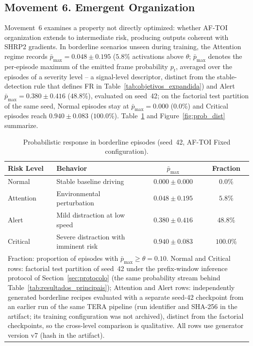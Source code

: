 \documentclass[a4paper,fleqn]{cas-dc}
\newcommand{\AFTOI}{\mbox{AF-TOI}\xspace}
\begin{document}
\subsection{Movement 6. Emergent Organization}
\label{sec:mov6_emergente}
Movement~6 examines a property not directly optimized: whether \AFTOI
organization extends to intermediate risk, producing outputs coherent with SHRP2
gradients. In borderline scenarios unseen during training, the Attention regime
records $\bar{p}_{\max} = 0.048 \pm 0.195$ ($5.8$\% activations above $\theta$;
{\color{\revcolor}$\bar{p}_{\max}$ denotes the per-episode maximum of the
emitted frame probability $p_t$, averaged over the episodes of a severity
level -- a signal-level descriptor, distinct from the stable-detection
rule that defines FR in Table~\ref{tab:objetivos_expandida}})
and Alert $\bar{p}_{\max} = 0.380 \pm 0.416$ ($48.8$\%), evaluated on seed~42{\color{\revcolor}; on the factorial test partition of the same seed, Normal episodes stay at $\bar{p}_{\max} = 0.000$ ($0.0$\%) and Critical episodes reach $0.940 \pm 0.083$ ($100.0$\%)}.
Table~\ref{tab:borderline} and Figure~\ref{fig:prob_dist} summarize.
\begin{table}[!tbp]
\centering
\caption{Probabilistic response in borderline episodes
(seed~42, \mbox{AF-TOI} Fixed configuration).}
\label{tab:borderline}
\footnotesize
\renewcommand{\arraystretch}{1.22}
\setlength{\tabcolsep}{3pt}
\begin{tabularx}{\columnwidth}{l X c c}
\toprule
\textbf{Risk Level} & \textbf{Behavior}
  & \textbf{$\bar{p}_{\max}$} & \textbf{Fraction} \\
\midrule
Normal    & Stable baseline driving
  & {\color{\revcolor}$0.000 \pm 0.000$} & $0.0$\% \\
\rowcolor{gray!8}
Attention & Environmental perturbation
  & $0.048 \pm 0.195$ & $5.8$\% \\
Alert     & Mild distraction at low speed
  & $0.380 \pm 0.416$ & $48.8$\% \\
\rowcolor{gray!8}
Critical  & Severe distraction with imminent risk
  & {\color{\revcolor}$0.940 \pm 0.083$} & {\color{\revcolor}$100.0$\%} \\
\bottomrule
\multicolumn{4}{p{0.96\columnwidth}}{\scriptsize
Fraction: proportion of episodes with $\bar{p}_{\max} \ge \theta = 0.10$.
{\color{\revcolor}Normal and Critical rows: factorial test partition of
seed~42 under the prefix-window inference protocol of
Section~\ref{sec:protocolo} (the same probability stream behind
Table~\ref{tab:resultados_principais}); Attention and Alert rows:
independently generated borderline recipes evaluated with a separate
seed-42 checkpoint from an earlier run of the same TERA pipeline (run
identifier and SHA-256 in the artifact; its training configuration was
not archived), distinct from the factorial checkpoints, so the
cross-level comparison is qualitative. All rows use generator version
v7 (hash in the artifact).}}
\end{tabularx}
\end{table}
\end{document}
